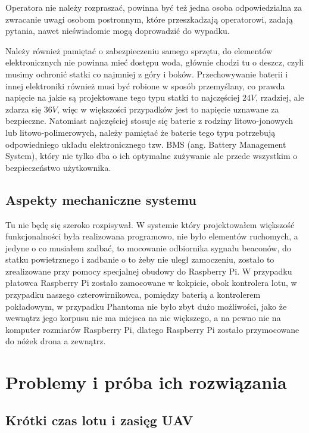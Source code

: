 Operatora nie należy rozpraszać, powinna być też jedna osoba odpowiedzialna za zwracanie uwagi osobom postronnym, które przeszkadzają operatorowi, zadają pytania, nawet nieświadomie mogą doprowadzić do wypadku. 

Należy również pamiętać o zabezpieczeniu samego sprzętu, do elementów elektronicznych nie powinna mieć dostępu woda, głównie chodzi tu o deszcz, czyli musimy ochronić statki co najmniej z góry i boków. Przechowywanie baterii i innej elektroniki również musi być robione w sposób przemyślany, co prawda napięcie na jakie są projektowane tego typu statki to najczęściej $24 V$, rzadziej, ale zdarza się $36 V$, więc w większości przypadków jest to napięcie uznawane za bezpieczne. Natomiast najczęściej stosuje się baterie z rodziny litowo-jonowych lub litowo-polimerowych, należy pamiętać że baterie tego typu potrzebują odpowiedniego układu elektronicznego tzw. BMS (ang. Battery Management System), który nie tylko dba o ich optymalne zużywanie ale przede wszystkim o bezpieczeństwo użytkownika.

\subsection{Aspekty mechaniczne systemu}

Tu nie będę się szeroko rozpisywał. W systemie który projektowałem większość funkcjonalności była realizowana programowo, nie było elementów ruchomych, a jedyne o co musiałem zadbać, to mocowanie odbiornika sygnału beaconów, do statku powietrznego i zadbanie o to żeby nie uległ zamoczeniu, zostało to zrealizowane przy pomocy specjalnej obudowy do Raspberry Pi. W przypadku płatowca Raspberry Pi zostało zamocowane w kokpicie, obok kontrolera lotu, w przypadku naszego czterowirnikowca, pomiędzy baterią a kontrolerem pokładowym, w przypadku Phantoma nie było zbyt dużo możliwości, jako że wewnątrz jego korpusu nie ma miejsca na nic większego, a na pewno nie na komputer rozmiarów Raspberry Pi, dlatego Raspberry Pi zostało przymocowane do nóżek drona a zewnątrz.

\section{Problemy i próba ich rozwiązania}

\subsection{Krótki czas lotu i zasięg UAV}

